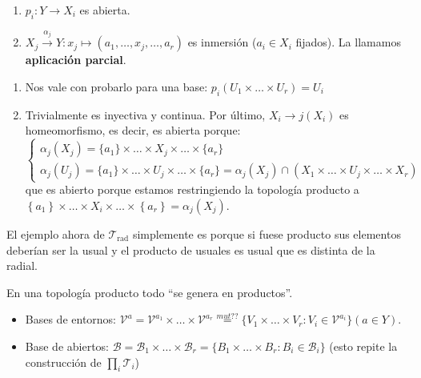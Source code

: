 \begin{prop}
\begin{enumerate}
    \item $p_i: Y \rightarrow X_i$ es abierta. 
    \item $X_j \xrightarrow{\alpha_j} Y: x_j \mapsto \left( a_1, \ldots, x_j, \ldots, a_r \right)$ es inmersión ($a_i \in X_i$ fijados). La llamamos \textbf{aplicación parcial}.
\end{enumerate}
\end{prop}
\begin{demo}
\begin{enumerate}
    \item Nos vale con probarlo para una base: $p_i\left( U_1 \times \ldots \times U_r \right) = U_i$ 
    \item Trivialmente es inyectiva y continua. Por último, $X_i \rightarrow j\left( X_i \right)$ es homeomorfismo, es decir, es abierta porque:
    \[
    \begin{cases}
        \alpha_j\left( X_j \right) = \{a_1\} \times \ldots \times X_j \times \ldots \times \{a_r\} \\
        \alpha_j\left( U_j \right) = \{a_1\} \times \ldots \times U_j \times \ldots \times \{a_r\} = \alpha_j\left( X_j \right) \cap \left( X_1 \times \ldots \times U_j \times \ldots \times X_r \right) 
    \end{cases}
    \]
    que es abierto porque estamos restringiendo la topología producto a $\left\{ a_1 \right\} \times \ldots \times X_i \times \ldots \times \left\{ a_r \right\} = \alpha_j\left( X_j \right)$.
\end{enumerate}
\end{demo}

\begin{ej}
El ejemplo ahora de $\mathcal{T}_{\text{rad}}$ simplemente es porque si fuese producto sus elementos deberían ser la usual y el producto de usuales es usual que es distinta de la radial.
\end{ej}

\begin{pg}
En una topología producto todo ``se genera en productos''.
\begin{ej}
\begin{itemize}
    \item Bases de entornos: $\mathcal{V}^a = \mathcal{V}^{a_1} \times \ldots \times \mathcal{V}^{a_r} \stackrel{mut??}{=} \{V_1 \times \ldots \times V_r: V_i \in \mathcal{V}^{a_i}\} \left( a \in Y \right)$.
    \item Base de abiertos: $\mathcal{B} = \mathcal{B}_1 \times \ldots \times \mathcal{B}_r = \{B_1 \times \ldots \times B_r: B_i \in \mathcal{B}_i\}$ (esto repite la construcción de $\prod_{i} \mathcal{T}_i$)
\end{itemize}
\end{ej}
\end{pg}


